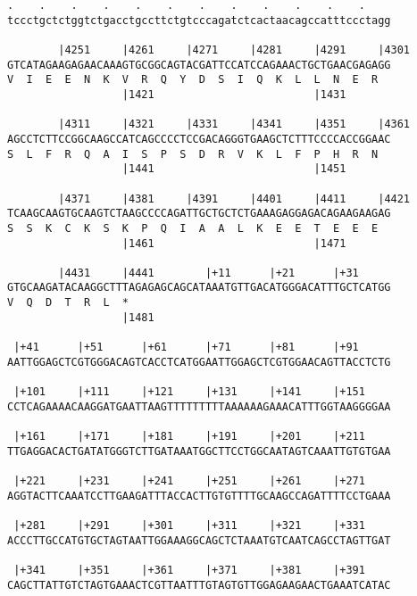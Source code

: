 \documentclass{article}
\begin{document}
\begin{Verbatim}
.    .    .    .    .    .    .    .    .    .    .    .    
tccctgctctggtctgacctgccttctgtcccagatctcactaacagccatttccctagg
                                                            
        |4251     |4261     |4271     |4281     |4291     |4301
GTCATAGAAGAGAACAAAGTGCGGCAGTACGATTCCATCCAGAAACTGCTGAACGAGAGG
V  I  E  E  N  K  V  R  Q  Y  D  S  I  Q  K  L  L  N  E  R  
                  |1421                         |1431       
  
        |4311     |4321     |4331     |4341     |4351     |4361
AGCCTCTTCCGGCAAGCCATCAGCCCCTCCGACAGGGTGAAGCTCTTTCCCCACCGGAAC
S  L  F  R  Q  A  I  S  P  S  D  R  V  K  L  F  P  H  R  N  
                  |1441                         |1451       
  
        |4371     |4381     |4391     |4401     |4411     |4421
TCAAGCAAGTGCAAGTCTAAGCCCCAGATTGCTGCTCTGAAAGAGGAGACAGAAGAAGAG
S  S  K  C  K  S  K  P  Q  I  A  A  L  K  E  E  T  E  E  E  
                  |1461                         |1471       
  
        |4431     |4441        |+11      |+21      |+31     
GTGCAAGATACAAGGCTTTAGAGAGCAGCATAAATGTTGACATGGGACATTTGCTCATGG
V  Q  D  T  R  L  *   
                  |1481                                     
  
 |+41      |+51      |+61      |+71      |+81      |+91     
AATTGGAGCTCGTGGGACAGTCACCTCATGGAATTGGAGCTCGTGGAACAGTTACCTCTG
                                                            
 |+101     |+111     |+121     |+131     |+141     |+151    
CCTCAGAAAACAAGGATGAATTAAGTTTTTTTTTAAAAAAGAAACATTTGGTAAGGGGAA
                                                            
 |+161     |+171     |+181     |+191     |+201     |+211    
TTGAGGACACTGATATGGGTCTTGATAAATGGCTTCCTGGCAATAGTCAAATTGTGTGAA
                                                            
 |+221     |+231     |+241     |+251     |+261     |+271    
AGGTACTTCAAATCCTTGAAGATTTACCACTTGTGTTTTGCAAGCCAGATTTTCCTGAAA
                                                            
 |+281     |+291     |+301     |+311     |+321     |+331    
ACCCTTGCCATGTGCTAGTAATTGGAAAGGCAGCTCTAAATGTCAATCAGCCTAGTTGAT
                                                            
 |+341     |+351     |+361     |+371     |+381     |+391    
CAGCTTATTGTCTAGTGAAACTCGTTAATTTGTAGTGTTGGAGAAGAACTGAAATCATAC
                                                            

\end{Verbatim}
\end{document}
